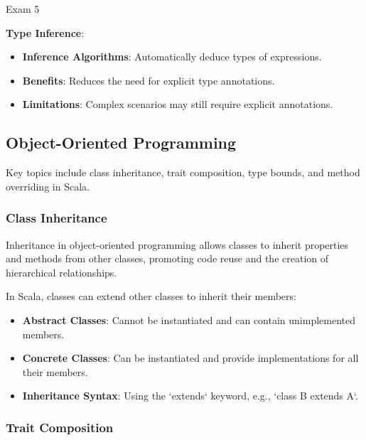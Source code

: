 \begin{examnotes}{Exam 5}
\begin{highlight}
        \textbf{Type Inference}:
        \begin{itemize}
            \item \textbf{Inference Algorithms}: Automatically deduce types of expressions.
            \item \textbf{Benefits}: Reduces the need for explicit type annotations.
            \item \textbf{Limitations}: Complex scenarios may still require explicit annotations.
        \end{itemize}
    \end{highlight}

    \subsection*{Object-Oriented Programming}

    Key topics include class inheritance, trait composition, type bounds, and method overriding in Scala.
    
    \subsubsection*{Class Inheritance}
    
    Inheritance in object-oriented programming allows classes to inherit properties and methods from other classes, promoting code reuse and the creation of hierarchical relationships.
    
    \begin{highlight}
        In Scala, classes can extend other classes to inherit their members:
        \begin{itemize}
            \item \textbf{Abstract Classes}: Cannot be instantiated and can contain unimplemented members.
            \item \textbf{Concrete Classes}: Can be instantiated and provide implementations for all their members.
            \item \textbf{Inheritance Syntax}: Using the `extends` keyword, e.g., `class B extends A`.
        \end{itemize}
    \end{highlight}
    
    \subsubsection*{Trait Composition}
    

\end{examnotes}
